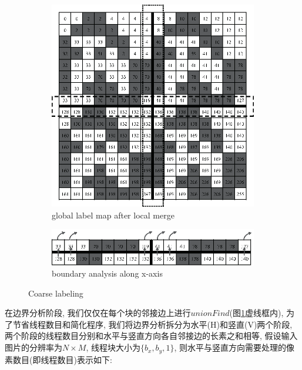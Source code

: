 \documentclass[a4paper, 11pt]{article}
\begin{document}
\begin{figure}[H]
	\centering
	\begin{subfigure}[b]{0.6\textwidth}
		\includegraphics[width=\textwidth]{images/cuda_uf/uf_7.eps}
		\caption{global label map after local merge}
		\label{fig:cuda_uf_7}
	\end{subfigure}
	\hfill
	\begin{subfigure}[b]{0.6\textwidth}
		\includegraphics[width=\textwidth]{images/cuda_uf/uf_8.eps}
		\caption{boundary analysis along x-axis}
		\label{fig:cuda_uf_8}
	\end{subfigure}
	\caption{Coarse labeling}
\end{figure}

在边界分析阶段, 我们仅仅在每个块的邻接边上进行$unionFind$(图\ref{fig:cuda_uf_7}虚线框内), 为了节省线程数目和简化程序, 我们将边界分析拆分为水平(H)和竖直(V)两个阶段, 两个阶段的线程数目分别和水平与竖直方向各自邻接边的长素之和相等, 假设输入图片的分辨率为$N \times M$, 线程块大小为$\{b_x,b_y,1\}$, 则水平与竖直方向需要处理的像素数目(即线程数目)表示如下:
\end{document}

